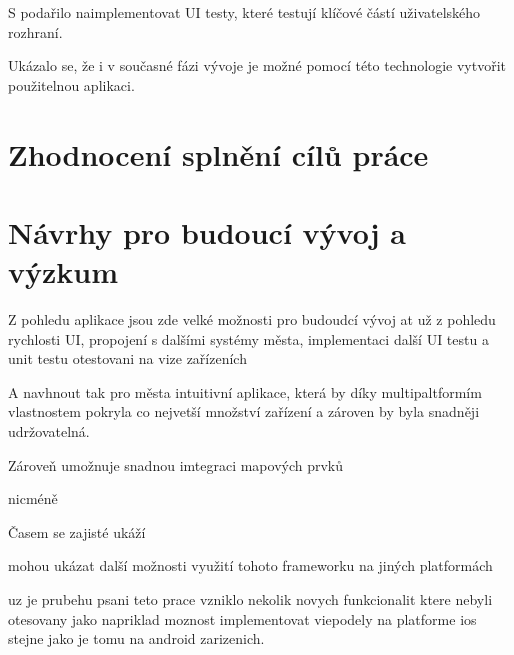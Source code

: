 S podařilo naimplementovat UI testy, které testují klíčové částí uživatelského rozhraní.

Ukázalo se, že i v současné fázi vývoje je možné pomocí této technologie vytvořit použitelnou aplikaci.

\section{Zhodnocení splnění cílů práce}
\section{Návrhy pro budoucí vývoj a výzkum}
Z pohledu aplikace jsou zde velké možnosti pro budoudcí vývoj 
at už z pohledu rychlosti UI, propojení s dalšími systémy města, implementaci další UI testu a unit testu
otestovani na vize zařízeních

A navhnout tak pro města intuitivní aplikace, která by díky multipaltformím vlastnostem pokryla co nejvetší množství zařízení
a zároven by byla snadněji udržovatelná.

Zároveň umožnuje snadnou imtegraci mapových prvků 

nicméně 


Časem se zajisté ukáží

\bigskip

mohou ukázat další možnosti využití tohoto frameworku na jiných platformách

uz je prubehu psani teto prace vzniklo nekolik novych funkcionalit ktere nebyli otesovany jako napriklad moznost
implementovat viepodely na platforme ios stejne jako je tomu na android zarizenich.
